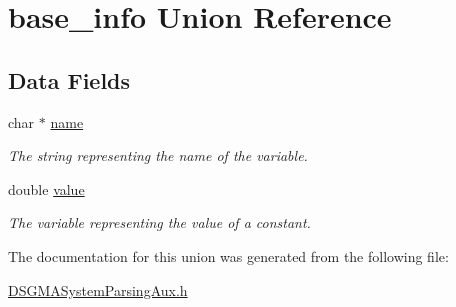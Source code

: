 \hypertarget{unionparser__aux_1_1base__info}{
\section{base\_\-info Union Reference}
\label{unionparser__aux_1_1base__info}
}
\subsection*{Data Fields}
\begin{DoxyCompactItemize}
\item 
\hypertarget{unionparser__aux_1_1base__info_a5ac083a645d964373f022d03df4849c8}{
char $\ast$ \hyperlink{unionparser__aux_1_1base__info_a5ac083a645d964373f022d03df4849c8}{name}}
\label{unionparser__aux_1_1base__info_a5ac083a645d964373f022d03df4849c8}

\begin{DoxyCompactList}\small\item\em The string representing the name of the variable. \item\end{DoxyCompactList}\item 
\hypertarget{unionparser__aux_1_1base__info_aee90379adb0307effb138f4871edbc5c}{
double \hyperlink{unionparser__aux_1_1base__info_aee90379adb0307effb138f4871edbc5c}{value}}
\label{unionparser__aux_1_1base__info_aee90379adb0307effb138f4871edbc5c}

\begin{DoxyCompactList}\small\item\em The variable representing the value of a constant. \item\end{DoxyCompactList}\end{DoxyCompactItemize}


The documentation for this union was generated from the following file:\begin{DoxyCompactItemize}
\item 
\hyperlink{_d_s_g_m_a_system_parsing_aux_8h}{DSGMASystemParsingAux.h}\end{DoxyCompactItemize}
